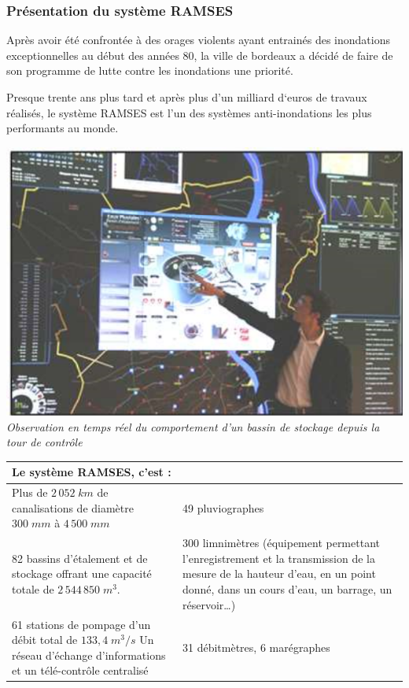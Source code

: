 \documentclass[10pt]{article}
\begin{document}
\begin{minipage}[c]{.47\linewidth}
\subsubsection*{Présentation du système RAMSES}

Après avoir été confrontée à des orages violents ayant entrainés des inondations exceptionnelles  au début des années 80, la ville de bordeaux a décidé de faire de son programme de lutte contre les inondations une priorité.  

Presque trente ans plus tard et après plus d’un milliard d‘euros de travaux réalisés, le système RAMSES est  l’un des systèmes anti-inondations les plus performants au monde.  

\end{minipage}\hfill
\begin{minipage}[c]{.47\linewidth}
\begin{center}
\includegraphics[width=.95\textwidth]{images/img1}
\textit{Observation en temps réel du comportement d’un bassin de stockage depuis la tour de contrôle }
\end{center}
\end{minipage}

\begin{center}
\begin{tabular}{|p{}|p{}|}
\hline
\multicolumn{2}{|l|}{Le système RAMSES, c’est : } \\
\hline
Plus de $2\,052\;km$ de canalisations de diamètre $300 \; mm$ à $4\,500\;mm$ & 49 pluviographes  \\
\hline
82 bassins d’étalement et de stockage offrant une capacité totale de  $2\,544\, 850\;m^3$.
& 
300 limnimètres (équipement permettant l'enregistrement et la transmission de la mesure de la hauteur d'eau, en un point donné, dans un cours d’eau, un barrage, un réservoir…)  \\
 \hline
 61 stations de pompage  d’un débit total de  $133,4 \; m^3/s$ 
 Un réseau d’échange d’informations et un télé-contrôle centralisé &  31 débitmètres, 6 marégraphes \\
 \hline
\end{tabular}
\end{center}
\end{document}
